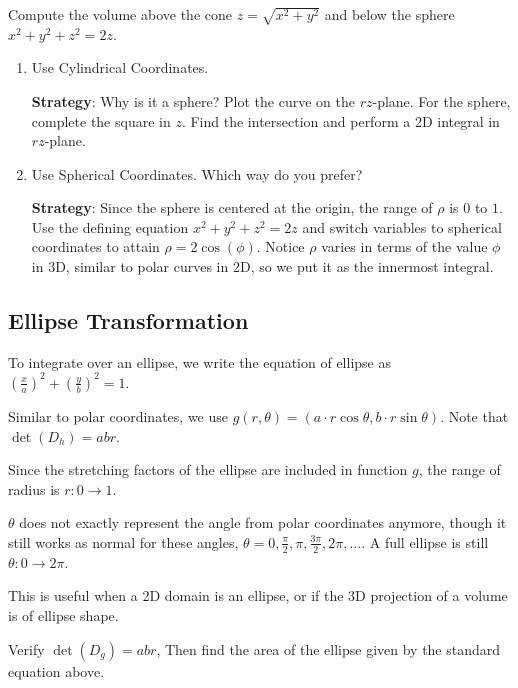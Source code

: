 \begin{exercise}
    Compute the volume above the cone $z = \sqrt{x^2 + y^2}$ and below the sphere $x^2 + y^2 + z^2 = 2z$. 

    \begin{enumerate}[label=\alph*)]
        \item Use Cylindrical Coordinates.
        
        \textbf{Strategy}: Why is it a sphere? Plot the curve on the $rz$-plane. For the sphere, complete the square in $z$. Find the intersection and perform a 2D integral in $rz$-plane.

        \item Use Spherical Coordinates. Which way do you prefer?
        
        \textbf{Strategy}: Since the sphere is  centered at the origin, the range of $\rho$ is  $0$ to $1$. Use the defining equation $x^2 + y^2 + z^2 = 2z$ and switch variables to spherical coordinates to attain $\rho = 2\cos(\phi)$. Notice $\rho$ varies in terms of the value $\phi$ in 3D, similar to polar curves in 2D, so we  put it as the innermost integral.
    \end{enumerate}
\end{exercise}

\subsection*{Ellipse Transformation}

To integrate over an ellipse, we write the equation of ellipse as $\left(\frac{x}{a}\right)^2 + \left(\frac{y}{b}\right)^2 = 1$.

Similar to polar coordinates, we use $g(r, \theta) = (a \cdot r \cos{\theta}, b \cdot r \sin{\theta})$. Note that $\det(D_h) = abr$. 

Since the stretching factors of the ellipse are included in function $g$, the range of radius is  $r: 0 \to 1$.

$\theta$ does not exactly represent the angle from polar coordinates anymore, though it still works as normal for these angles, $\theta = 0, \frac{\pi}{2}, \pi, \frac{3\pi}{2}, 2\pi, \dots$. A full ellipse is still $\theta: 0 \to 2\pi$. 

This is useful when a 2D domain is an ellipse, or if the 3D projection of a volume is of ellipse shape.

\begin{exercise}
   Verify $\det(D_g) = abr$, Then find the area of the ellipse given by the standard equation above.
\end{exercise}

